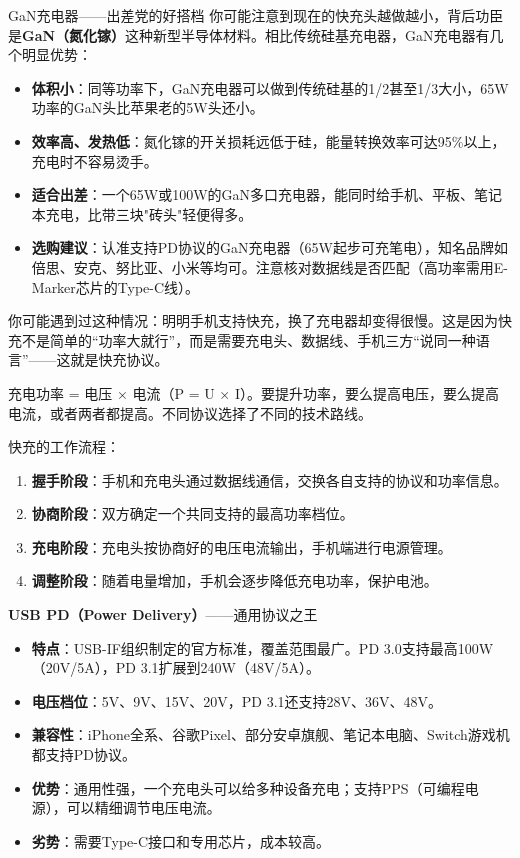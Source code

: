 \begin{tcbinfo}{GaN充电器——出差党的好搭档}
你可能注意到现在的快充头越做越小，背后功臣是\textbf{GaN（氮化镓）}这种新型半导体材料。相比传统硅基充电器，GaN充电器有几个明显优势：

\begin{itemize}
  \item \textbf{体积小}：同等功率下，GaN充电器可以做到传统硅基的1/2甚至1/3大小，65W功率的GaN头比苹果老的5W头还小。
  \item \textbf{效率高、发热低}：氮化镓的开关损耗远低于硅，能量转换效率可达95\%以上，充电时不容易烫手。
  \item \textbf{适合出差}：一个65W或100W的GaN多口充电器，能同时给手机、平板、笔记本充电，比带三块"砖头"轻便得多。
  \item \textbf{选购建议}：认准支持PD协议的GaN充电器（65W起步可充笔电），知名品牌如倍思、安克、努比亚、小米等均可。注意核对数据线是否匹配（高功率需用E-Marker芯片的Type-C线）。
\end{itemize}

\end{tcbinfo}


你可能遇到过这种情况：明明手机支持快充，换了充电器却变得很慢。这是因为快充不是简单的“功率大就行”，而是需要充电头、数据线、手机三方“说同一种语言”——这就是快充协议。


充电功率 = 电压 × 电流（P = U × I）。要提升功率，要么提高电压，要么提高电流，或者两者都提高。不同协议选择了不同的技术路线。

快充的工作流程：

\begin{enumerate}
  \item \textbf{握手阶段}：手机和充电头通过数据线通信，交换各自支持的协议和功率信息。
  \item \textbf{协商阶段}：双方确定一个共同支持的最高功率档位。
  \item \textbf{充电阶段}：充电头按协商好的电压电流输出，手机端进行电源管理。
  \item \textbf{调整阶段}：随着电量增加，手机会逐步降低充电功率，保护电池。
\end{enumerate}


\textbf{USB PD（Power Delivery）}——通用协议之王

\begin{itemize}
  \item \textbf{特点}：USB-IF组织制定的官方标准，覆盖范围最广。PD 3.0支持最高100W（20V/5A），PD 3.1扩展到240W（48V/5A）。
  \item \textbf{电压档位}：5V、9V、15V、20V，PD 3.1还支持28V、36V、48V。
  \item \textbf{兼容性}：iPhone全系、谷歌Pixel、部分安卓旗舰、笔记本电脑、Switch游戏机都支持PD协议。
  \item \textbf{优势}：通用性强，一个充电头可以给多种设备充电；支持PPS（可编程电源），可以精细调节电压电流。
  \item \textbf{劣势}：需要Type-C接口和专用芯片，成本较高。
\end{itemize}


